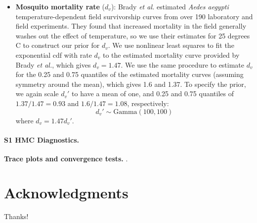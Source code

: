 \documentclass[10pt,letterpaper]{article}
\begin{document}
\begin{itemize}
\\
\item \textbf{Mosquito mortality rate} ($d_v$): Brady \textit{et al.} \cite{Brady2013} estimated \textit{Aedes aegypti} temperature-dependent field survivorship curves from over 190 laboratory and field experiments.
They found that increased mortality in the field generally washes out the effect of temperature, so we use their estimates for 25 degrees C to construct our prior for $d_v$.  
We use nonlinear least squares to fit the exponential cdf with rate $d_v$ to the estimated mortality curve provided by Brady \textit{et al.}, which gives $d_v = 1.47$.
We use the same procedure to estimate $d_v$ for the 0.25 and 0.75 quantiles of the estimated mortality curves (assuming symmetry around the mean), which gives 1.6 and 1.37.
To specify the prior, we again scale $d_v'$ to have a mean of one, and 0.25 and 0.75 quantiles of $1.37 / 1.47 = 0.93$ and $1.6 / 1.47 = 1.08$, respectively:
\begin{equation}
d_v' \sim \text{Gamma}(100, 100)
\end{equation}
where $d_v = 1.47d_v'$.
\end{itemize}

\paragraph*{S1 HMC Diagnostics.}
\label{S1_Diag}
{\bf Trace plots and convergence tests.}  .

\section*{Acknowledgments}

Thanks!

\nolinenumbers

%
%
% 



\end{document}
